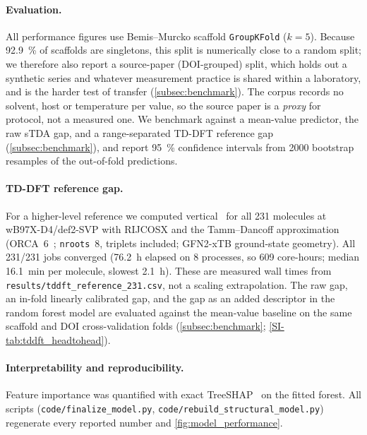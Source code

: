 \paragraph{Evaluation.}
All performance figures use Bemis--Murcko scaffold \texttt{GroupKFold}
($k=5$). Because \qty{92.9}{\percent} of scaffolds are singletons, this split is
numerically close to a random split; we therefore also report a source-paper
(DOI-grouped) split, which holds out a synthetic series and whatever measurement
practice is shared within a laboratory, and is the harder test of transfer
(\cref{subsec:benchmark}). The corpus records no solvent, host or temperature per value,
so the source paper is a \emph{proxy} for protocol, not a measured one.
We benchmark against a mean-value predictor, the raw sTDA gap, and a
range-separated TD-DFT reference gap (\cref{subsec:benchmark}), and report
\qty{95}{\percent} confidence intervals from \num{2000} bootstrap resamples of the
out-of-fold predictions.

\paragraph{TD-DFT reference gap.}
For a higher-level reference we computed vertical \deltaest\ for all \num{231}
molecules at wB97X-D4/def2-SVP with RIJCOSX and the Tamm--Dancoff approximation
(ORCA~6~\cite{Neese2020}; \texttt{nroots}~8, triplets included; GFN2-xTB
ground-state geometry). All \num{231}/\num{231} jobs converged
(\qty{76.2}{\hour} elapsed on \num{8} processes, so \num{609} core-hours; median
\qty{16.1}{\minute} per molecule, slowest \qty{2.1}{\hour}). These are measured wall times
from \texttt{results/tddft\_reference\_231.csv}, not a scaling extrapolation. The raw
gap, an in-fold linearly calibrated gap, and the gap as an added descriptor in
the random forest model are evaluated against the mean-value baseline on the same
scaffold and DOI cross-validation folds (\cref{subsec:benchmark};
\cref{SI-tab:tddft_headtohead}).

\paragraph{Interpretability and reproducibility.}
Feature importance was quantified with exact TreeSHAP~\cite{Lundberg2017} on the
fitted forest. All scripts (\texttt{code/finalize\_model.py},
\texttt{code/rebuild\_structural\_model.py}) regenerate every reported number and
\cref{fig:model_performance}.

